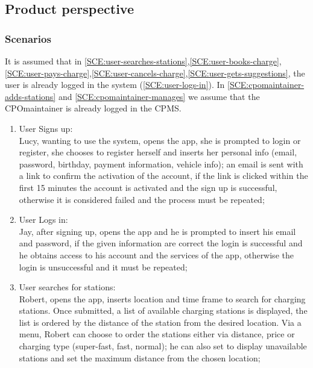 \subsection{Product perspective}

\subsubsection{Scenarios}
It is assumed that in \ref{SCE:user-searches-stations},\ref{SCE:user-books-charge},\ref{SCE:user-pays-charge},\ref{SCE:user-cancels-charge},\ref{SCE:user-gets-suggestions}, the user is already logged in the system (\ref{SCE:user-logs-in}). In \ref{SCE:cpomaintainer-adds-stations} and \ref{SCE:cpomaintainer-manages} we assume that the \ac{CPO}maintainer is already logged in the \ac{CPMS}.
\begin{enumerate}[label=\textbf{S\arabic*}]
      \item User Signs up:\\
            Lucy, wanting to use the system, opens the app, she is prompted to login or register,
            she chooses to register herself and inserts her personal info (email, password, birthday, payment information, vehicle info);
            an email is sent with a link to confirm the activation of the account, if the link is clicked within
            the first 15 minutes the account is activated and the sign up is successful,
            otherwise it is considered failed and the process must be repeated;\label{SCE:user-signs-up}
      \item User Logs in:\\
            Jay, after signing up, opens the app and he is prompted to insert his email and password,
            if the given information are correct the login is successful and he obtains access to his account
            and the services of the app, otherwise the login is unsuccessful and it must be repeated;\label{SCE:user-logs-in}
      \item User searches for stations:\\
            Robert, opens the app, inserts location and time frame to search for charging stations.
            Once submitted, a list of available charging stations is displayed, the list is ordered by the distance of the station
            from the desired location. Via a menu, Robert can choose to order the stations either via distance, price or charging type (super-fast, fast, normal); he can also set to display unavailable stations and set the maximum distance from the chosen location;\label{SCE:user-searches-stations}

\end{enumerate}
